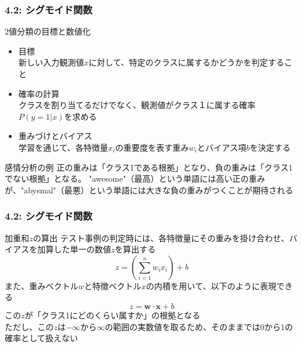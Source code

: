 \documentclass[unicode,11pt]{beamer} %
\begin{document}
\begin{frame}
    \frametitle{4.2: シグモイド関数}
    \begin{alertblock}{2値分類の目標と数値化}
        \begin{itemize}
            \item 目標\\新しい入力観測値$x$に対して、特定のクラスに属するかどうかを判定すること
            \item 確率の計算\\クラスを割り当てるだけでなく、観測値がクラス１に属する確率$P(y = 1|x)$を求める
            \item 重みづけとバイアス\\学習を通じて、各特徴量$x_i$の重要度を表す重み$w_i$とバイアス項$b$を決定する
        \end{itemize}
    \end{alertblock}
    \begin{exampleblock}{感情分析の例}
        正の重みは「クラス1である根拠」となり、負の重みは「クラス1でない根拠」となる。
        "awesome"（最高）という単語には高い正の重みが、"abysmal"（最悪）という単語には大きな負の重みがつくことが期待される
    \end{exampleblock}
\end{frame}

\begin{frame}
    \frametitle{4.2: シグモイド関数}
    \begin{alertblock}{加重和$z$の算出}
        テスト事例の判定時には、各特徴量にその重みを掛け合わせ、バイアスを加算した単一の数値$z$を算出する
        \begin{equation*}
            z = (\sum_{i=1}^{n} w_i x_i) + b
        \end{equation*}
        また、重みベクトル$w$と特徴ベクトル$x$の内積を用いて、以下のように表現できる
        \begin{equation*}
            z = \boldsymbol{w} \cdot \boldsymbol{x} + b 
        \end{equation*}
        この$z$が「クラス1にどのくらい属すか」の根拠となる\\
        ただし、この$z$は$-\infty$から$\infty$の範囲の実数値を取るため、そのままでは$0$から$1$の確率として扱えない
    \end{alertblock}
\end{frame}
\end{document}
